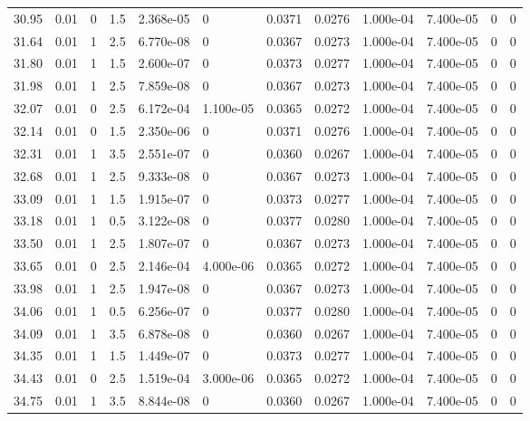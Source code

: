 \documentclass[preview]{standalone}
\begin{document}
{{{{\begin{tabular}{L{1.2cm}C{1.2cm} C{0.3cm}C{0.5cm} C{1.4cm}C{1.4cm} C{1.4cm}C{1.4cm} C{1.6cm}C{1.6cm} C{1.6cm}C{1.6cm}}
  30.95  &  0.01  & 0     & 1.5 &  2.368e-05  & 0  &  0.0371&   0.0276& 1.000e-04 & 7.400e-05   &  0 & 0  \\ 
  31.64  &  0.01  & 1     & 2.5 &  6.770e-08  & 0  &  0.0367&   0.0273& 1.000e-04 & 7.400e-05   &  0 & 0  \\ 
  31.80  &  0.01  & 1     & 1.5 &  2.600e-07  & 0  &  0.0373&   0.0277& 1.000e-04 & 7.400e-05   &  0 & 0  \\ 
  31.98  &  0.01  & 1     & 2.5 &  7.859e-08  & 0  &  0.0367&   0.0273& 1.000e-04 & 7.400e-05   &  0 & 0  \\ 
  32.07  &  0.01  & 0     & 2.5 &  6.172e-04  & 1.100e-05  &  0.0365&   0.0272& 1.000e-04 & 7.400e-05   &  0 & 0  \\ 
  32.14  &  0.01  & 0     & 1.5 &  2.350e-06  & 0  &  0.0371&   0.0276& 1.000e-04 & 7.400e-05   &  0 & 0  \\ 
  32.31  &  0.01  & 1     & 3.5 &  2.551e-07  & 0  &  0.0360&   0.0267& 1.000e-04 & 7.400e-05   &  0 & 0  \\ 
  32.68  &  0.01  & 1     & 2.5 &  9.333e-08  & 0  &  0.0367&   0.0273& 1.000e-04 & 7.400e-05   &  0 & 0  \\ 
  33.09  &  0.01  & 1     & 1.5 &  1.915e-07  & 0  &  0.0373&   0.0277& 1.000e-04 & 7.400e-05   &  0 & 0  \\ 
  33.18  &  0.01  & 1     & 0.5 &  3.122e-08  & 0  &  0.0377&   0.0280& 1.000e-04 & 7.400e-05   &  0 & 0  \\ 
  33.50  &  0.01  & 1     & 2.5 &  1.807e-07  & 0  &  0.0367&   0.0273& 1.000e-04 & 7.400e-05   &  0 & 0  \\ 
  33.65  &  0.01  & 0     & 2.5 &  2.146e-04  & 4.000e-06  &  0.0365&   0.0272& 1.000e-04 & 7.400e-05   &  0 & 0  \\ 
  33.98  &  0.01  & 1     & 2.5 &  1.947e-08  & 0  &  0.0367&   0.0273& 1.000e-04 & 7.400e-05   &  0 & 0  \\ 
  34.06  &  0.01  & 1     & 0.5 &  6.256e-07  & 0  &  0.0377&   0.0280& 1.000e-04 & 7.400e-05   &  0 & 0  \\ 
  34.09  &  0.01  & 1     & 3.5 &  6.878e-08  & 0  &  0.0360&   0.0267& 1.000e-04 & 7.400e-05   &  0 & 0  \\ 
  34.35  &  0.01  & 1     & 1.5 &  1.449e-07  & 0  &  0.0373&   0.0277& 1.000e-04 & 7.400e-05   &  0 & 0  \\ 
  34.43  &  0.01  & 0     & 2.5 &  1.519e-04  & 3.000e-06  &  0.0365&   0.0272& 1.000e-04 & 7.400e-05   &  0 & 0  \\ 
  34.75  &  0.01  & 1     & 3.5 &  8.844e-08  & 0  &  0.0360&   0.0267& 1.000e-04 & 7.400e-05   &  0 & 0  \\ 

\end{tabular}}}}}
\end{document}
